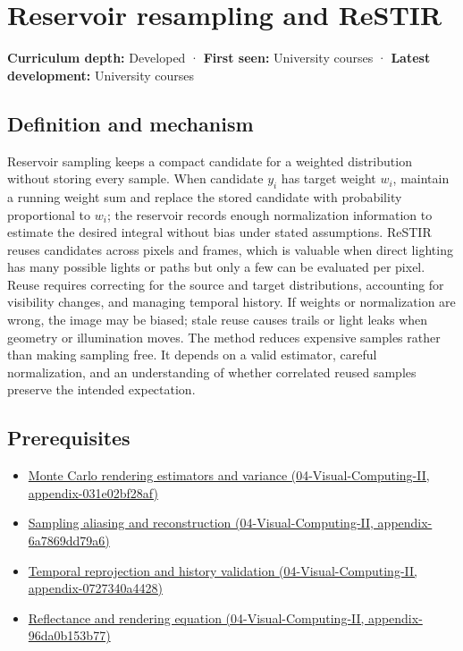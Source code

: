 \hypertarget{appendix-68be451b78b1}{}
\section{Reservoir resampling and ReSTIR}\label{appendix-68be451b78b1-reservoir-resampling-and-restir}

\textbf{Curriculum depth:} Developed · \textbf{First seen:} University courses · \textbf{Latest development:} University courses

\subsection{Definition and mechanism}\label{appendix-68be451b78b1-definition-and-mechanism}

Reservoir sampling keeps a compact candidate for a weighted distribution without storing every sample. When candidate \(y_i\) has target weight \(w_i\), maintain a running weight sum and replace the stored candidate with probability proportional to \(w_i\); the reservoir records enough normalization information to estimate the desired integral without bias under stated assumptions. ReSTIR reuses candidates across pixels and frames, which is valuable when direct lighting has many possible lights or paths but only a few can be evaluated per pixel. Reuse requires correcting for the source and target distributions, accounting for visibility changes, and managing temporal history. If weights or normalization are wrong, the image may be biased; stale reuse causes trails or light leaks when geometry or illumination moves. The method reduces expensive samples rather than making sampling free. It depends on a valid estimator, careful normalization, and an understanding of whether correlated reused samples preserve the intended expectation.

\subsection{Prerequisites}\label{appendix-68be451b78b1-prerequisites}

\begin{itemize}
\tightlist
\item
  \href{../04-Visual-Computing-II/main.pdf\#nameddest=appendix-031e02bf28af}{Monte Carlo rendering estimators and variance (04-Visual-Computing-II, appendix-031e02bf28af)}
\item
  \href{../04-Visual-Computing-II/main.pdf\#nameddest=appendix-6a7869dd79a6}{Sampling aliasing and reconstruction (04-Visual-Computing-II, appendix-6a7869dd79a6)}
\item
  \href{../04-Visual-Computing-II/main.pdf\#nameddest=appendix-0727340a4428}{Temporal reprojection and history validation (04-Visual-Computing-II, appendix-0727340a4428)}
\item
  \href{../04-Visual-Computing-II/main.pdf\#nameddest=appendix-96da0b153b77}{Reflectance and rendering equation (04-Visual-Computing-II, appendix-96da0b153b77)}
\end{itemize}

